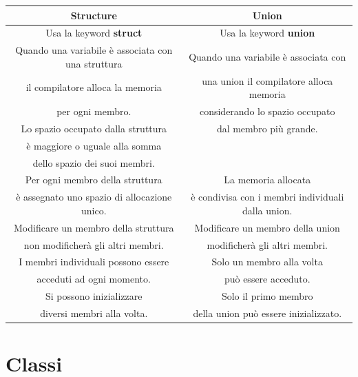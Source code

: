 \begin{tabular}{|c|c|}
	\hline
	\textbf{Structure} & \textbf{Union} \\
	\hline
	\textsf{\small Usa la keyword \textbf{struct}} & \textsf{\small Usa la keyword \textbf{union}}\\
	\hline
	\textsf{\small Quando una variabile è associata con una struttura} & \textsf{\small Quando una variabile è associata con } \\
	\textsf{\small il compilatore alloca la memoria } & \textsf{\small una union il compilatore alloca memoria } \\
	\textsf{\small per ogni membro.} & \textsf{\small considerando lo spazio occupato } \\
	\textsf{\small Lo spazio occupato dalla struttura} & \textsf{\small dal membro più grande.} \\
	\textsf{\small è maggiore o uguale alla somma} & \textsf{\small } \\
	\textsf{\small dello spazio dei suoi membri.} & \textsf{\small } \\
	\hline
	\textsf{\small Per ogni membro della struttura} & \textsf{\small La memoria allocata} \\
	\textsf{\small è assegnato uno spazio di allocazione unico.} & \textsf{\small è condivisa con i membri individuali dalla union.} \\
	\hline
	\textsf{\small Modificare un membro della struttura} & \textsf{\small Modificare un membro della union} \\
	\textsf{\small non modificherà gli altri membri.} & \textsf{\small modificherà gli altri membri.} \\
	\hline
	\textsf{\small I membri individuali possono essere} & \textsf{\small Solo un membro alla volta} \\
	\textsf{\small acceduti ad ogni momento.} & \textsf{\small può essere acceduto.} \\
	\hline
	\textsf{\small Si possono inizializzare } & \textsf{\small Solo il primo membro} \\
	\textsf{\small diversi membri alla volta.} & \textsf{\small della union può essere inizializzato.} \\
	\hline
\end{tabular}


\newpage

\section{Classi}

